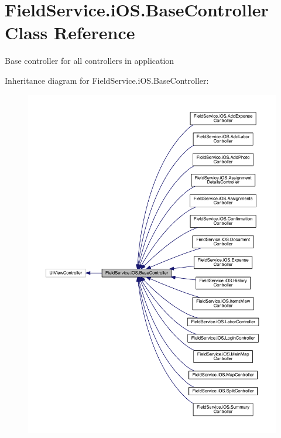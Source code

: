 \hypertarget{class_field_service_1_1i_o_s_1_1_base_controller}{\section{Field\+Service.\+i\+O\+S.\+Base\+Controller Class Reference}
\label{class_field_service_1_1i_o_s_1_1_base_controller}
}


Base controller for all controllers in application  




Inheritance diagram for Field\+Service.\+i\+O\+S.\+Base\+Controller\+:
\nopagebreak
\begin{figure}[H]
\begin{center}
\leavevmode
\includegraphics[width=350pt]{class_field_service_1_1i_o_s_1_1_base_controller__inherit__graph}
\end{center}
\end{figure}


